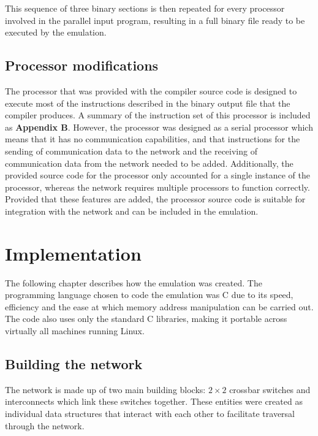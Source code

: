 \documentclass[a4paper, 12pt]{article}
\begin{document}
This sequence of three binary sections is then repeated for every processor involved in the parallel input program, resulting in a full binary file ready to be executed by the emulation.

\subsection{Processor modifications}
\label{sec:processor_mods}

The processor that was provided with the compiler source code is designed to execute most of the instructions described in the binary output file that the compiler produces. A summary of the instruction set of this processor is included as \textbf{Appendix B}. However, the processor was designed as a serial processor which means that it has no communication capabilities, and that instructions for the sending of communication data to the network and the receiving of communication data from the network needed to be added. Additionally, the provided source code for the processor only accounted for a single instance of the processor, whereas the network requires multiple processors to function correctly. Provided that these features are added, the processor source code is suitable for integration with the network and can be included in the emulation. 

\newpage
\section{Implementation}

The following chapter describes how the emulation was created. The programming language chosen to code the emulation was C due to its speed, efficiency and the ease at which memory address manipulation can be carried out. The code also uses only the standard C libraries, making it portable across virtually all machines running Linux.

\subsection{Building the network}
\label{sec:imp_build_network}

The network is made up of two main building blocks: $2 \times 2$ crossbar switches and interconnects which link these switches together. These entities were created as individual data structures that interact with each other to facilitate traversal through the network.\\
\end{document}
